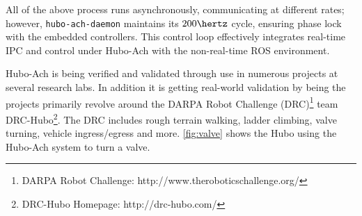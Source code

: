 All of the above process runs asynchronously, communicating at different rates;
however, {\tt hubo-ach-daemon} maintains its $200 \hertz$ cycle,
ensuring phase lock with the embedded controllers.  This control loop
effectively integrates real-time IPC and control under Hubo-Ach with
the non-real-time ROS environment.


Hubo-Ach is being verified and validated through use in numerous projects at several research labs.
In addition it is getting real-world validation by being the projects primarily revolve around the DARPA Robot Challenge
(DRC)\footnote{DARPA Robot Challenge:
  http://www.theroboticschallenge.org/} team
DRC-Hubo\footnote{DRC-Hubo Homepage: http://drc-hubo.com/}.  The DRC
includes rough terrain walking, ladder climbing, valve turning,
vehicle ingress/egress and more.  \autoref{fig:valve} shows the Hubo
using the Hubo-Ach system to turn a valve.


